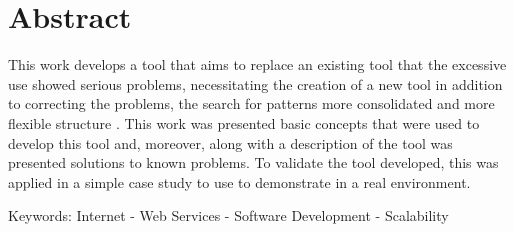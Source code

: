 \chapter*{Abstract}
\vspace{0.5cm}

This work develops a tool that aims to replace an existing tool that the excessive use showed serious problems, necessitating the creation of a new tool in addition to correcting the problems, the search for patterns more consolidated and more flexible structure . This work was presented basic concepts that were used to develop this tool and, moreover, along with a description of the tool was presented solutions to known problems. To validate the tool developed, this was applied in a simple case study to use to demonstrate in a real environment.

Keywords: Internet - Web Services - Software Development - Scalability